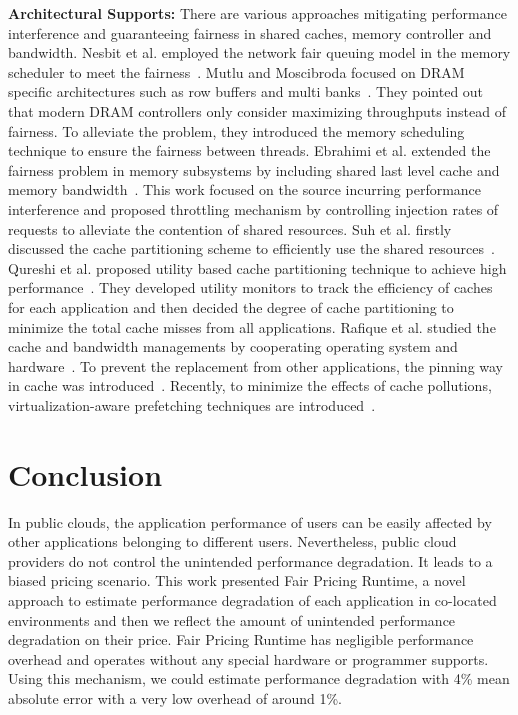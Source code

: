 \documentclass{sig-alternate}
\begin{document}
{\bf Architectural Supports: } There are various approaches mitigating performance interference and guaranteeing fairness in shared caches, memory controller and bandwidth. 
Nesbit et al. employed the network fair queuing model in the memory scheduler to meet the fairness~\cite{Nesbit:2006:FQM}. Mutlu and Moscibroda focused on DRAM specific architectures such as row buffers and multi banks~\cite{stfm}. They pointed out that modern DRAM controllers only consider maximizing throughputs instead of fairness. To alleviate the problem, they introduced the memory scheduling technique to ensure the fairness between threads. Ebrahimi et al. extended the fairness problem in memory subsystems by including shared last level cache and memory bandwidth~\cite{fst}. This work focused on the source incurring performance interference and proposed throttling mechanism by controlling injection rates of requests to alleviate the contention of shared resources. 
Suh et al. firstly discussed the cache partitioning scheme to efficiently use the shared resources~\cite{Suh:2002:NMM:874076.876484}. Qureshi et al. proposed utility based cache partitioning technique to achieve high performance~\cite{Qureshi:2006:UCP:1194816.1194855}. They developed utility monitors to track the efficiency of caches for each application and then decided the degree of cache partitioning to minimize the total cache misses from all applications. Rafique et al. studied the cache and bandwidth managements by cooperating operating system and hardware~\cite{Rafique:2006:ASO:1152154.1152160,Rafique:2007:EMD:1299042.1299052 }. To prevent the replacement from other applications, the pinning way in cache was introduced~\cite{Srikantaiah:2008:ASP:1346281.1346299}. Recently, to minimize the effects of cache pollutions, virtualization-aware prefetching techniques are introduced~\cite{Daly,ReCap,Ahn:2014:MVP:2742155.2742195}.
\section{Conclusion}
\label{sec:Conclusion}

In public clouds, the application performance of users can be easily affected by other applications belonging to different users. 
Nevertheless, public cloud providers do not control the unintended performance degradation. It leads to a biased pricing scenario. 
This work presented Fair Pricing Runtime, a novel approach to estimate performance degradation of each application in co-located environments and then we reflect the amount of unintended performance degradation on their price. 
Fair Pricing Runtime has negligible performance overhead and operates without any special hardware or programmer supports. Using this mechanism, we could estimate performance degradation with 4\% mean absolute error with a very low overhead of around 1\%.

\balance

\end{document}
